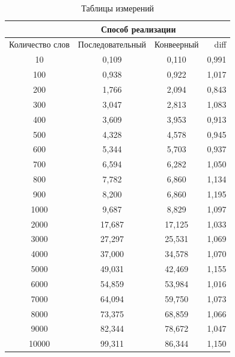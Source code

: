 \documentclass[../main.tex]{subfiles}
\begin{document}
	\begin{table}
		\label{tab:2}
		\begin{tabular}{|c|c|c|r|}
			\hline
			& \multicolumn{ 2}{|c|}{Способ реализации} &            \\
			\hline
			Количество слов & Последовательный & Конвеерный  &       diff \\
			\hline
			10 &      0,109 &      0,110 &      0,991 \\
			\hline
			100 &      0,938 &      0,922 &      1,017 \\
			\hline
			200 &      1,766 &      2,094 &      0,843 \\
			\hline
			300 &      3,047 &      2,813 &      1,083 \\
			\hline
			400 &      3,609 &      3,953 &      0,913 \\
			\hline
			500 &      4,328 &      4,578 &      0,945 \\
			\hline
			600 &      5,344 &      5,703 &      0,937 \\
			\hline
			700 &      6,594 &      6,282 &      1,050 \\
			\hline
			800 &      7,782 &      6,860 &      1,134 \\
			\hline
			900 &      8,200 &      6,860 &      1,195 \\
			\hline
			1000 &      9,687 &      8,829 &      1,097 \\
			\hline
			2000 &     17,687 &     17,125 &      1,033 \\
			\hline
			3000 &     27,297 &     25,531 &      1,069 \\
			\hline
			4000 &     37,000 &     34,578 &      1,070 \\
			\hline
			5000 &     49,031 &     42,469 &      1,155 \\
			\hline
			6000 &     54,859 &     53,984 &      1,016 \\
			\hline
			7000 &     64,094 &     59,750 &      1,073 \\
			\hline
			8000 &     73,375 &     68,859 &      1,066 \\
			\hline
			9000 &     82,344 &     78,672 &      1,047 \\
			\hline
			10000 &     99,311 &     86,344 &      1,150 \\
			\hline
		\end{tabular} 
		\caption{Таблицы измерений}
	\end{table} 
\end{document}
